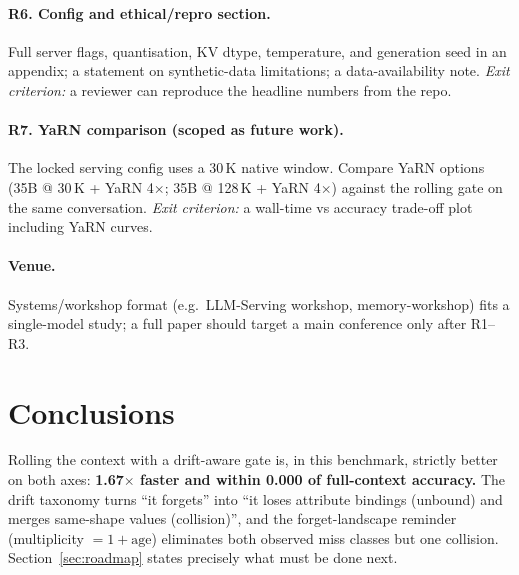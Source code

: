 \documentclass{article}
\begin{document}
\paragraph{R6. Config and ethical/repro section.}
Full server flags, quantisation, KV dtype, temperature, and generation seed in an
appendix; a statement on synthetic-data limitations; a data-availability note.
\emph{Exit criterion:} a reviewer can reproduce the headline numbers from the repo.

\paragraph{R7. YaRN comparison (scoped as future work).}
The locked serving config uses a 30\,K native window. Compare YaRN options (35B @ 30\,K
+ YaRN 4$\times$; 35B @ 128\,K + YaRN 4$\times$) against the rolling gate on the same
conversation. \emph{Exit criterion:} a wall-time vs accuracy trade-off plot including
YaRN curves.

\paragraph{Venue.} Systems/workshop format (e.g.\ LLM-Serving workshop, memory-workshop)
fits a single-model study; a full paper should target a main conference only after R1--R3.

\section{Conclusions}

Rolling the context with a drift-aware gate is, in this benchmark, strictly better on
both axes: \textbf{1.67$\times$ faster and within 0.000 of full-context accuracy.} The
drift taxonomy turns ``it forgets'' into ``it loses attribute bindings (unbound) and
merges same-shape values (collision)'', and the forget-landscape reminder
(multiplicity $= 1 + \text{age}$) eliminates both observed miss classes but one
collision. Section~\ref{sec:roadmap} states precisely what must be done next.
\end{document}
